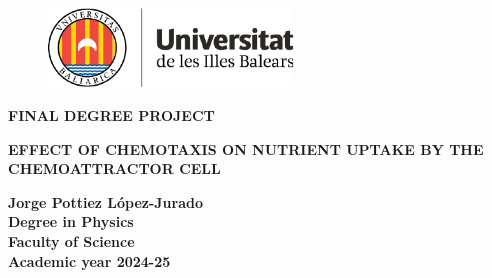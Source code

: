 \begin{titlepage}
    
    \vspace*{5mm}
    \begin{figure}[h!]
    \includegraphics[width=6.5cm]{Images/logo.pdf}
    \end{figure}
    
    {
    \selectfont
    \vspace{15mm}
    \raggedright
    \LARGE\textbf{FINAL DEGREE PROJECT}\\
    \vspace{25mm}
    
    \raggedleft
    \LARGE\textbf{EFFECT OF CHEMOTAXIS ON NUTRIENT UPTAKE BY THE CHEMOATTRACTOR CELL}\\
    \vspace{30mm}
    
    \raggedright
    \LARGE\textbf{Jorge Pottiez López-Jurado}\\
    \vspace{12mm}
    \large\textbf{Degree in Physics}\\
    \vspace{7mm}
    \large\textbf{Faculty of Science}\\
    \vspace{20mm}
    \normalsize\textbf{Academic year 2024-25}\\
    }
\end{titlepage}

{
\newpage
\thispagestyle{empty}
\mbox{}
\newpage
}


